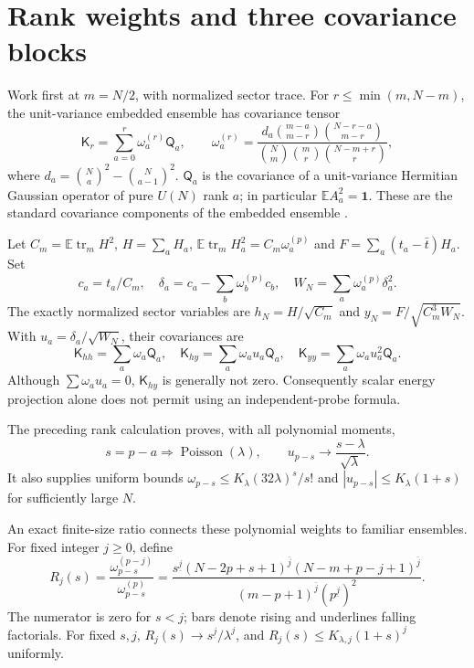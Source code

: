 \documentclass[11pt,a4paper]{article}
\newcommand{\E}{\mathbb E}
\newcommand{\tr}{\operatorname{tr}}
\newcommand{\K}{\mathsf K}
\begin{document}
\newpage
\section{Rank weights and three covariance blocks}
Work first at $m=N/2$, with normalized sector trace. For
$r\leq\min(m,N-m)$, the unit-variance embedded ensemble has
covariance tensor
\begin{equation}
 \K_r=\sum_{a=0}^r\omega_a^{(r)}\mathsf Q_a,\qquad
 \omega_a^{(r)}=
 \frac{d_a\binom{m-a}{m-r}\binom{N-r-a}{m-r}}
 {\binom Nm\binom mr\binom{N-m+r}{r}},          \label{weights}
\end{equation}
where $d_a=\binom Na^2-\binom N{a-1}^2$.
$\mathsf Q_a$ is the covariance of a unit-variance Hermitian
Gaussian operator of pure $U(N)$ rank $a$; in particular
$\E A_a^2=\mathbf1$. These are the standard covariance components
of the embedded ensemble \cite{kota}.

Let $C_m=\E\tr_m H^2$, $H=\sum_a H_a$,
$\E\tr_m H_a^2=C_m\omega_a^{(p)}$ and
$F=\sum_a(t_a-\bar t)H_a$. Set
\[
 c_a=t_a/C_m,\quad
 \delta_a=c_a-\sum_b\omega_b^{(p)}c_b,\quad
 W_N=\sum_a\omega_a^{(p)}\delta_a^2.
\]
The exactly normalized sector variables are
$h_N=H/\sqrt{C_m}$ and $y_N=F/\sqrt{C_m^3W_N}$.
With $u_a=\delta_a/\sqrt{W_N}$, their covariances are
\begin{equation}
 \K_{hh}=\sum_a\omega_a\mathsf Q_a,\quad
 \K_{hy}=\sum_a\omega_a u_a\mathsf Q_a,\quad
 \K_{yy}=\sum_a\omega_a u_a^2\mathsf Q_a.       \label{blocks}
\end{equation}
Although $\sum\omega_a u_a=0$, $\K_{hy}$ is generally not zero.
Consequently scalar energy projection alone does not permit
using an independent-probe formula.

The preceding rank calculation proves, with all polynomial moments,
\begin{equation}
 s=p-a\Longrightarrow\operatorname{Poisson}(\lambda),\qquad
 u_{p-s}\longrightarrow\frac{s-\lambda}{\sqrt\lambda}.
                                                               \label{poisson}
\end{equation}
It also supplies uniform bounds
$\omega_{p-s}\leq K_\lambda(32\lambda)^s/s!$ and
$|u_{p-s}|\leq K_\lambda(1+s)$ for sufficiently large $N$.

An exact finite-size ratio connects these polynomial weights
to familiar ensembles. For fixed integer $j\geq0$, define
\begin{equation}
 R_j(s)=\frac{\omega_{p-s}^{(p-j)}}{\omega_{p-s}^{(p)}}
 =\frac{s^{\underline j}(N-2p+s+1)^{\overline j}
                 (N-m+p-j+1)^{\overline j}}
 {(m-p+1)^{\overline j}(p^{\underline j})^2}.    \label{ratio}
\end{equation}
The numerator is zero for $s<j$; bars denote rising and
underlines falling factorials. For fixed $s,j$,
$R_j(s)\to s^{\underline j}/\lambda^j$, and
$R_j(s)\leq K_{\lambda,j}(1+s)^j$ uniformly.
\end{document}

